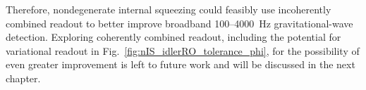 Therefore, nondegenerate internal squeezing could feasibly use incoherently combined readout to better improve broadband 100--4000~Hz gravitational-wave detection. %
Exploring coherently combined readout, including the potential for variational readout in Fig.~\ref{fig:nIS_idlerRO_tolerance_phi}, for the possibility of even greater improvement is left to future work and will be discussed in the next chapter. %



